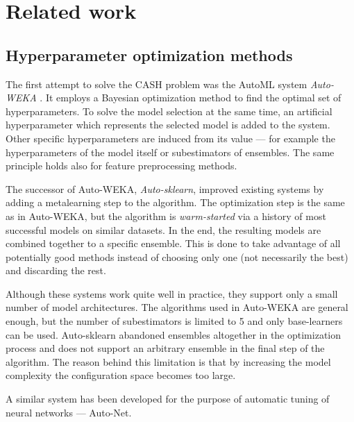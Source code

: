 \chapter{Related work} \label{ch2:related}


\section{Hyperparameter optimization methods} \label{CASH}
The first attempt to solve the CASH problem was the AutoML system \emph{Auto-WEKA}
\citep{DBLP:journals/corr/abs-1208-3719}. It employs a Bayesian optimization
method to find the optimal set of hyperparameters. To solve the model selection
at the same time, an artificial hyperparameter which represents the selected
model is added to the system. Other specific hyperparameters are induced from its
value --- for example the hyperparameters of the model itself or subestimators of
ensembles. The same principle holds also for feature preprocessing methods.

The successor of Auto-WEKA, \emph{Auto-sklearn}, improved existing systems by
adding a metalearning step to the algorithm. The optimization step is the same
as in Auto-WEKA, but the algorithm is \emph{warm-started} via a history of most
successful models on similar datasets. In the end, the resulting models are
combined together to a specific ensemble. This is done to take advantage of all
potentially good methods instead of choosing only one (not necessarily the best)
and discarding the rest. \citep{Feurer:2015:ERA:2969442.2969547}

Although these systems work quite well in practice, they support only a small
number of model architectures. The algorithms used in Auto-WEKA are general
enough, but the number of subestimators is limited to 5 and only base-learners can
be used. Auto-sklearn abandoned ensembles altogether in the optimization process
and does not support an arbitrary ensemble in the final step of the algorithm.
The reason behind this limitation is that by increasing the model complexity the
configuration space becomes too large.

A similar system has been developed for the purpose of automatic tuning of neural
networks --- Auto-Net. \citep{pmlr-v64-mendoza_towards_2016}

